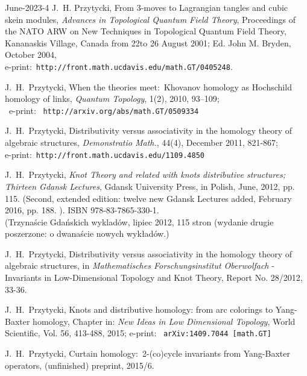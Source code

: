 \documentclass[12pt]{amsart}
\begin{document}
\begin{thebibliography}{June-2023-4}
J.~H. Przytycki, From 3-moves to Lagrangian tangles and cubic skein modules,
{\it Advances in Topological Quantum Field Theory},
Proceedings of the NATO ARW on New Techniques in Topological Quantum
Field Theory, Kananaskis Village, Canada from 22to 26 August 2001; Ed. John M. Bryden, October 2004,\\
e-print:\ {\tt http://front.math.ucdavis.edu/math.GT/0405248}.

J.~H.~Przytycki,
When the theories meet:\ Khovanov homology as
Hochschild homology of links, {\it Quantum Topology}, 1(2), 2010, 93--109; \\
 \ e-print: \ {\tt http://arxiv.org/abs/math.GT/0509334}

J.~H.~Przytycki, Distributivity versus associativity in the homology theory of algebraic structures,
 {\it Demonstratio Math.}, 44(4), December 2011, 821-867; \\
 e-print:\ {\tt http://front.math.ucdavis.edu/1109.4850}

 J.~H.~Przytycki, 
{\it Knot Theory and related with knots distributive structures;
Thirteen Gdansk Lectures}, Gdansk University Press, in Polish, June, 2012, pp. 115.
(Second, extended edition: twelve new Gdansk Lectures added, February 2016, pp. 188. ).
ISBN 978-83-7865-330-1.\\
(Trzyna\'scie Gda\'nskich wyklad\'ow, lipiec 2012, 115 stron (wydanie drugie poszerzone:
o dwana\'scie nowych wyk{\l}ad\'ow.)

J.~H.~Przytycki, Distributivity versus associativity in the homology theory of algebraic structures,
in {\it Mathematisches Forschungsinstitut Oberwolfach} - Invariants in Low-Dimensional Topology and Knot Theory,
Report No. 28/2012, 33-36.


J.~H.~Przytycki, Knots and distributive homology: from arc colorings to Yang-Baxter homology,
 Chapter in: {\it New Ideas in Low Dimensional Topology}, World Scientific, Vol. 56, 413-488, 2015;
e-print: \ {\tt arXiv:1409.7044 [math.GT]}

J.~H.~Przytycki, Curtain homology:\ 2-(co)cycle invariants from Yang-Baxter operators, (unfinished) preprint, 2015/6. 


\end{thebibliography}
\end{document}
